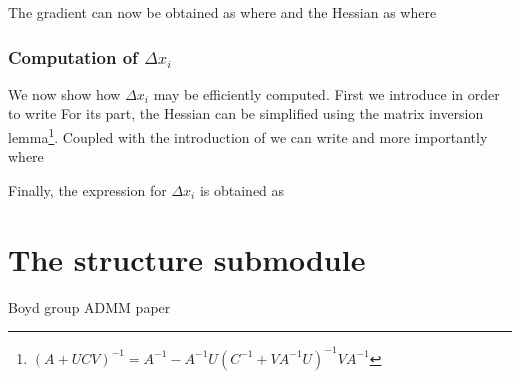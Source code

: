 \documentclass{book}
\begin{document}
The gradient can now be obtained as
    where
    and the Hessian as 
    where



\subsubsection{Computation of $\Delta x_i$}
We now show how $\Delta x_i$ may be efficiently computed.
First we introduce
    in order to write
For its part, the Hessian can be simplified using the matrix inversion lemma\footnote{$(A + UCV)^{-1} = A^{-1} - A^{-1}U (C^{-1} + V A^{-1} U)^{-1} V A^{-1}$}.
Coupled with the introduction of 
    we can write
    and more importantly
    where
 
Finally, the expression for $\Delta x_i$ is obtained as
        
    
\section{The structure submodule}


\begin{thebibliography}{99}
 Boyd group ADMM paper
\end{thebibliography}
\end{document}
